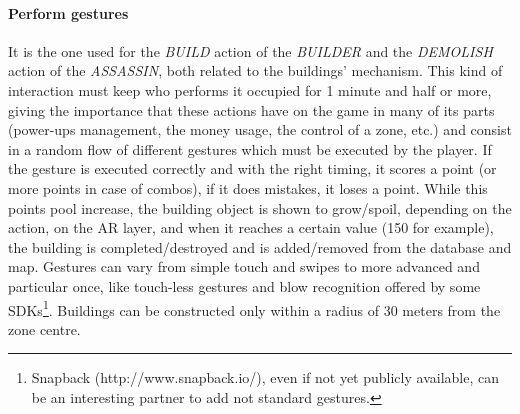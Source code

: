 				\paragraph{Perform gestures}
				It is the one used for the \emph{BUILD} action of the \emph{BUILDER} and the \emph{DEMOLISH} action of the \emph{ASSASSIN}, both related to the buildings' mechanism.
				This kind of interaction must keep who performs it occupied for 1 minute and half or more, giving the importance that these actions have on the game in many of its parts (power-ups management, the money usage, the control of a zone, etc.) and consist in a random flow of different gestures which must be executed by the player. If the gesture is executed correctly and with the right timing, it scores a point (or more points in case of combos), if it does mistakes, it loses a point. While this points pool increase, the building object is shown to grow/spoil, depending on the action, on the AR layer, and when it reaches a certain value (150 for example), the building is completed/destroyed and is added/removed from the database and map.
				Gestures can vary from simple touch and swipes to more advanced and particular once, like touch-less gestures and blow recognition offered by some SDKs\footnote{Snapback (http://www.snapback.io/), even if not yet publicly available, can be an interesting partner to add not standard gestures.}.
				Buildings can be constructed only within a radius of 30 meters from the zone centre.